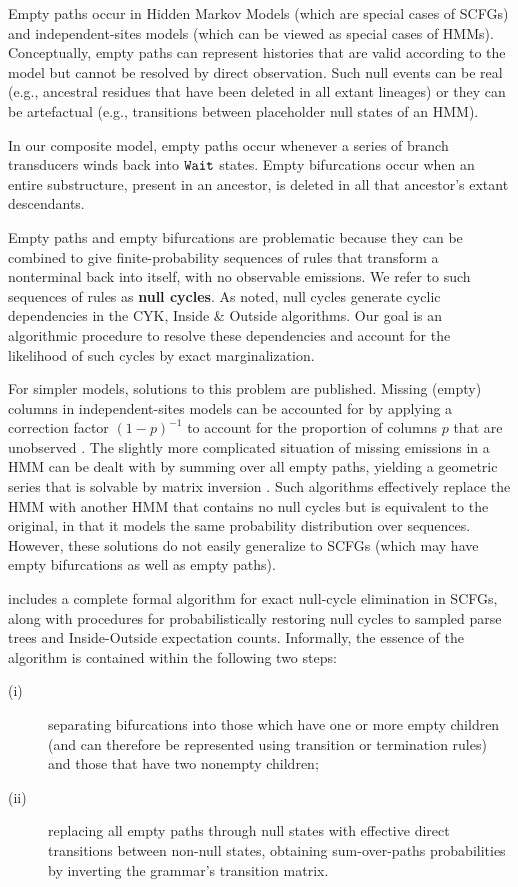 \documentclass[10pt]{article}
\begin{document}
Empty paths occur in Hidden Markov Models (which are special cases of SCFGs)
and independent-sites models (which can be viewed as special cases of HMMs).
Conceptually, empty paths can represent histories that are valid
according to the model but cannot be resolved by direct observation.
Such null events can be real (e.g., ancestral residues that have been deleted in all extant lineages)
or they can be artefactual (e.g., transitions between placeholder null states of an HMM).

In our composite model, empty paths occur whenever a series of branch transducers winds back into $\mathtt{Wait}$ states.
Empty bifurcations occur when an entire substructure, present in an ancestor, is deleted in all that ancestor's extant descendants.

Empty paths and empty bifurcations are problematic because they can be combined to give finite-probability sequences of rules
that transform a nonterminal back into itself, with no observable emissions.
We refer to such sequences of rules as {\bf null cycles}.
As noted, null cycles generate cyclic dependencies in the CYK, Inside \& Outside algorithms.
Our goal is an algorithmic procedure to resolve these dependencies and account for the likelihood of such cycles by exact marginalization.

For simpler models, solutions to this problem are published.
Missing (empty) columns in independent-sites models can be accounted for by applying a correction factor $(1-p)^{-1}$
to account for the proportion of columns $p$ that are unobserved \cite{RivasEddy2008}.
The slightly more complicated situation of missing emissions in a HMM can be dealt with by
summing over all empty paths, yielding a geometric series that is solvable by matrix inversion
\cite{Holmes2003,Holmes2007,Lunter2007}.
Such algorithms
effectively replace the HMM
with another HMM that contains no null cycles but is equivalent to the original, in that it models the
same probability distribution over sequences.
However, these solutions do not easily generalize to SCFGs
(which may have empty bifurcations as well as empty paths).

 includes a complete formal algorithm for exact null-cycle elimination in SCFGs,
along with procedures for probabilistically restoring null cycles
to sampled parse trees and Inside-Outside expectation counts.
Informally, the essence of the algorithm is contained within the following two steps:
\begin{description}
\item[(i)] separating bifurcations
into those which have one or more empty children (and can therefore be
represented using transition or termination rules) and those that have
two nonempty children;
\item[(ii)] replacing all empty paths through null states with effective direct transitions between non-null states,
obtaining sum-over-paths probabilities by inverting the grammar's transition matrix.
\end{description}
\end{document}
